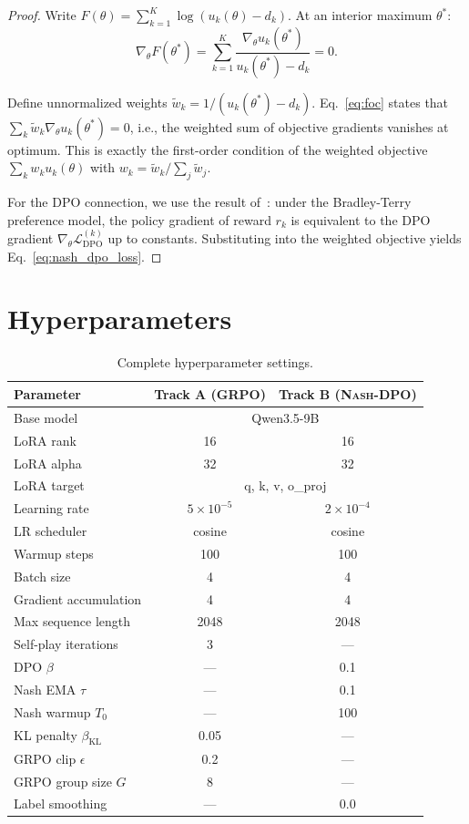 \documentclass{article}
\newcommand{\KL}{\mathrm{KL}}
\newcommand{\NashDPO}{\textsc{Nash-DPO}}
\begin{document}
\begin{proof}
Write $F(\theta) = \sum_{k=1}^K \log(u_k(\theta) - d_k)$.
At an interior maximum $\theta^*$:
\begin{equation}
\nabla_\theta F(\theta^*) = \sum_{k=1}^K \frac{\nabla_\theta u_k(\theta^*)}{u_k(\theta^*) - d_k} = 0.
\label{eq:foc}
\end{equation}

Define unnormalized weights $\tilde{w}_k = 1/(u_k(\theta^*) - d_k)$.
Eq.~\eqref{eq:foc} states that $\sum_k \tilde{w}_k \nabla_\theta u_k(\theta^*) = 0$, i.e., the weighted sum of objective gradients vanishes at optimum.
This is exactly the first-order condition of the weighted objective $\sum_k w_k u_k(\theta)$ with $w_k = \tilde{w}_k / \sum_j \tilde{w}_j$.

For the DPO connection, we use the result of~\citet{rafailov2024direct}: under the Bradley-Terry preference model, the policy gradient of reward $r_k$ is equivalent to the DPO gradient $\nabla_\theta \mathcal{L}_{\text{DPO}}^{(k)}$ up to constants.
Substituting into the weighted objective yields Eq.~\eqref{eq:nash_dpo_loss}.
\end{proof}


\section{Hyperparameters}
\label{app:hyperparams}

\begin{table}[h]
\centering
\small
\caption{Complete hyperparameter settings.}
\label{tab:hyperparams_full}
\begin{tabular}{lcc}
\toprule
Parameter & Track A (GRPO) & Track B (\NashDPO{}) \\
\midrule
Base model & \multicolumn{2}{c}{Qwen3.5-9B} \\
LoRA rank & 16 & 16 \\
LoRA alpha & 32 & 32 \\
LoRA target & \multicolumn{2}{c}{q, k, v, o\_proj} \\
Learning rate & $5 \times 10^{-5}$ & $2 \times 10^{-4}$ \\
LR scheduler & cosine & cosine \\
Warmup steps & 100 & 100 \\
Batch size & 4 & 4 \\
Gradient accumulation & 4 & 4 \\
Max sequence length & 2048 & 2048 \\
Self-play iterations & 3 & --- \\
DPO $\beta$ & --- & 0.1 \\
Nash EMA $\tau$ & --- & 0.1 \\
Nash warmup $T_0$ & --- & 100 \\
KL penalty $\beta_{\KL}$ & 0.05 & --- \\
GRPO clip $\epsilon$ & 0.2 & --- \\
GRPO group size $G$ & 8 & --- \\
Label smoothing & --- & 0.0 \\
\bottomrule
\end{tabular}
\end{table}
\end{document}
